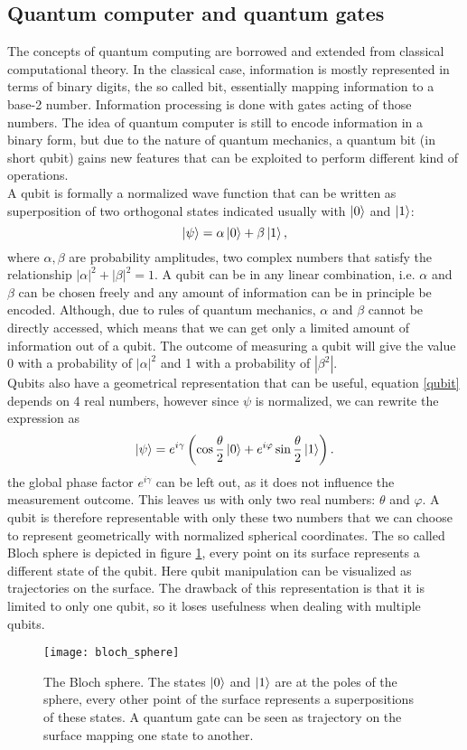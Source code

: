\subsection{Quantum computer and quantum gates}
The concepts of quantum computing are borrowed and extended from classical computational theory. In the classical case, information is mostly represented in terms of binary digits, the so called bit, essentially mapping information to a base-2 number. Information processing is done with gates acting of those numbers. The idea of quantum computer is still to encode information in a binary form, but due to the nature of quantum mechanics, a quantum bit (in short qubit) gains new features that can be exploited to perform different kind of operations.\\
A qubit is formally a normalized wave function that can be written as superposition of two orthogonal states indicated usually with $\ket{0}$ and $\ket{1}$:
\begin{equation}
\label{qubit}
\ket{\psi} = \alpha \ket{0} + \beta\ket{1},
\end{equation}
where $\alpha,\beta$ are probability amplitudes, two complex numbers that satisfy the relationship $|\alpha|^2+|\beta|^2 = 1$.
A qubit can be in any linear combination, i.e. $\alpha$ and $\beta$ can be chosen freely and any amount of information can be in principle be encoded. Although, due to rules of quantum mechanics, $\alpha$ and $\beta$ cannot be directly accessed, which means that we can get only a limited amount of information out of a qubit. The outcome of measuring a qubit will give the value 0 with a probability of $|\alpha|^2$ and 1 with a probability of $|\beta^2|$.\\
Qubits also have a geometrical representation that can be useful, equation \eqref{qubit} depends on 4 real numbers, however since $\psi$ is normalized, we can rewrite the expression as
\begin{equation}
\ket{\psi} = e^{i\gamma}\left(\cos\frac{\theta}{2}\ket{0} + e^{i\varphi}\sin\frac{\theta}{2}\ket{1}\right).
\end{equation}
the global phase factor $e^{i\gamma}$ can be left out, as it does not influence the measurement outcome. This leaves us with only two real numbers: $\theta$ and $\varphi$. A qubit is therefore representable with only these two numbers that we can choose to represent geometrically with normalized spherical coordinates. The so called Bloch sphere is depicted in figure \ref{blochsphere}, every point on its surface represents a different state of the qubit. Here qubit manipulation can be visualized as trajectories on the surface. The drawback of this representation is that it is limited to only one qubit, so it loses usefulness when dealing with multiple qubits.
\begin{figure}[H]
\centering
\texttt{[image: bloch\_sphere]}
\caption{The Bloch sphere. The states $\ket{0}$ and $\ket{1}$ are at the poles of the sphere, every other point of the surface represents a superpositions of these states. A quantum gate can be seen as trajectory on the surface mapping one state to another.}
\label{blochsphere}
\end{figure}

